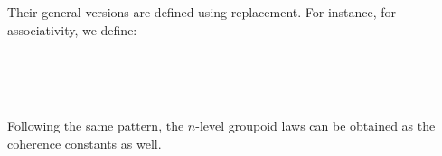 \begin{code}
\\
%
\\
%
\\
%
\\
\> \AgdaSymbol{:}  \AgdaSymbol{\{}\AgdaSymbol{\}}\<%
\\
\>[0]\<[9]%
\>[9]\AgdaSymbol{(} \AgdaFunction{[} \AgdaSymbol{((} \AgdaInductiveConstructor{,} \AgdaSymbol{)} \AgdaInductiveConstructor{,}  \AgdaInductiveConstructor{,}  \AgdaInductiveConstructor{,} \AgdaSymbol{)} \AgdaInductiveConstructor{,}  \AgdaFunction{]tm}  \AgdaSymbol{)}\<%
\\
\> \AgdaSymbol{=}  \AgdaSymbol{(}  \AgdaSymbol{)}\<%
\\
%
\\
\> \AgdaSymbol{:}  \<%
\\
\> \AgdaSymbol{=}  \AgdaSymbol{(} \AgdaSymbol{(} \AgdaSymbol{(}  \AgdaSymbol{)} \AgdaSymbol{(} \AgdaSymbol{))} \AgdaSymbol{(} \AgdaSymbol{))}\<%
\\
\>\<\end{code}
\noindent Their general versions are defined using replacement. For instance, for associativity, we define:

\begin{code}\>\<%
\\
\> \<[14]%
\>[14]\AgdaSymbol{:} \AgdaSymbol{\}(} \AgdaSymbol{:}  \AgdaSymbol{)}   \AgdaSymbol{(}  \AgdaSymbol{)}\<%
\\
\>  \<[14]%
\>[14]\AgdaSymbol{=}    \<[37]%
\>[37]\<%
\\
\>\<\end{code}
Following the same pattern, the $n$-level groupoid laws can be obtained as the coherence constants as well.